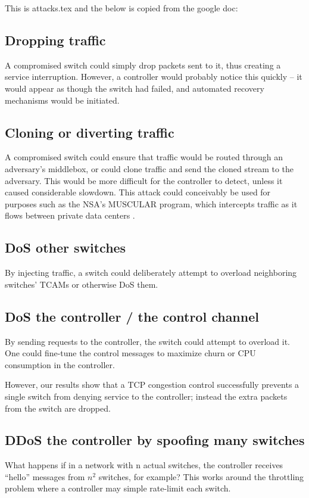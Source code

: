 This is attacks.tex and the below is copied from the google doc: 

\subsection{Dropping traffic} 
A compromised switch could simply drop packets sent to it, thus creating a service interruption. However, a controller would probably notice this quickly -- it would appear as though the switch had failed, and automated recovery mechanisms would be initiated.

\subsection{Cloning or diverting traffic}
A compromised switch could ensure that traffic would be routed through an adversary’s middlebox, or could clone traffic and send the cloned stream to the adversary. This would be more difficult for the controller to detect, unless it caused considerable slowdown. This attack could conceivably be used for purposes such as the NSA’s MUSCULAR program, which intercepts traffic as it flows between private data centers \cite{muscular}. 

\subsection{DoS other switches}
By injecting traffic, a switch could deliberately attempt to overload neighboring switches’ TCAMs or otherwise DoS them.

\subsection{DoS the controller / the control channel}
By sending requests to the controller, the switch could attempt to overload it. One could fine-tune the control messages to maximize churn or CPU consumption in the controller.

However, our results show that a TCP congestion control successfully prevents a single switch from denying service to the controller; instead the extra packets from the switch are dropped.

\subsection{DDoS the controller by spoofing many switches}
What happens if in a network with n actual switches, the controller receives “hello” messages from $n^2$ switches, for example? This works around the throttling problem where a controller may simple rate-limit each switch.

